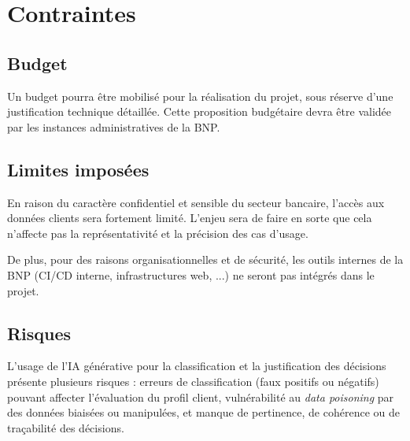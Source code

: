 \section{Contraintes}

\subsection{Budget}

Un budget pourra être mobilisé pour la réalisation du projet, sous réserve d'une justification technique détaillée.
Cette proposition budgétaire devra être validée par les instances administratives de la BNP.

\subsection{Limites imposées}

En raison du caractère confidentiel et sensible du secteur bancaire, l'accès aux données clients sera fortement limité.
L'enjeu sera de faire en sorte que cela n'affecte pas la représentativité et la précision des cas d'usage.

De plus, pour des raisons organisationnelles et de sécurité, les outils internes de la BNP (CI/CD interne,
infrastructures web, ...) ne seront pas intégrés dans le projet.

\subsection{Risques}

L’usage de l’IA générative pour la classification et la justification des décisions présente plusieurs risques :
erreurs de classification (faux positifs ou négatifs) pouvant affecter l’évaluation du profil client, vulnérabilité
au \textit{data poisoning} par des données biaisées ou manipulées, et manque de pertinence, de cohérence ou de
traçabilité des décisions.
